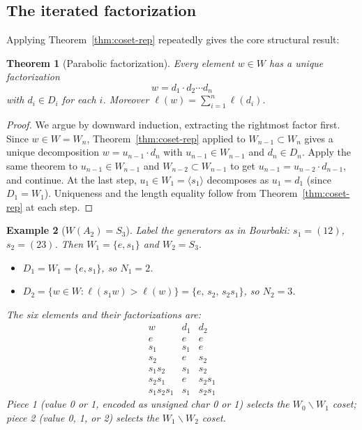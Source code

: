 \documentclass[12pt]{amsart}
\newtheorem{theorem}{Theorem}[section]
\newtheorem{example}[theorem]{Example}
\begin{document}
\subsection{The iterated factorization}

Applying Theorem~\ref{thm:coset-rep} repeatedly gives the core structural
result:

\begin{theorem}[Parabolic factorization]\label{thm:factorization}
Every element $w \in W$ has a unique factorization
\[
  w = d_1 \cdot d_2 \cdots d_n
\]
with $d_i \in D_i$ for each $i$.  Moreover $\ell(w) = \sum_{i=1}^n \ell(d_i)$.
\end{theorem}

\begin{proof}
We argue by downward induction, extracting the rightmost factor first.
Since $w \in W = W_n$, Theorem~\ref{thm:coset-rep} applied to $W_{n-1} \subset
W_n$ gives a unique decomposition $w = u_{n-1} \cdot d_n$ with $u_{n-1} \in
W_{n-1}$ and $d_n \in D_n$.  Apply the same theorem to $u_{n-1} \in W_{n-1}$
and $W_{n-2} \subset W_{n-1}$ to get $u_{n-1} = u_{n-2} \cdot d_{n-1}$, and
continue.  At the last step, $u_1 \in W_1 = \langle s_1 \rangle$ decomposes as
$u_1 = d_1$ (since $D_1 = W_1$).  Uniqueness and the length equality follow
from Theorem~\ref{thm:coset-rep} at each step.
\end{proof}

\begin{example}[$W(A_2) = S_3$]\label{ex:A2}
Label the generators as in Bourbaki: $s_1 = (12)$, $s_2 = (23)$.  Then
$W_1 = \{e, s_1\}$ and $W_2 = S_3$.
\begin{itemize}
  \item $D_1 = W_1 = \{e, s_1\}$, so $N_1 = 2$.
  \item $D_2 = \{w \in W : \ell(s_1 w) > \ell(w)\} = \{e,\, s_2,\, s_2 s_1\}$,
    so $N_2 = 3$.
\end{itemize}
The six elements and their factorizations are:
\[
\begin{array}{c|cc}
w & d_1 & d_2 \\ \hline
e & e & e \\
s_1 & s_1 & e \\
s_2 & e & s_2 \\
s_1 s_2 & s_1 & s_2 \\
s_2 s_1 & e & s_2 s_1 \\
s_1 s_2 s_1 & s_1 & s_2 s_1
\end{array}
\]
Piece 1 (value 0 or 1, encoded as unsigned char 0 or 1) selects the
$W_0 \backslash W_1$ coset; piece 2 (value 0, 1, or 2) selects the
$W_1 \backslash W_2$ coset.
\end{example}
\end{document}

